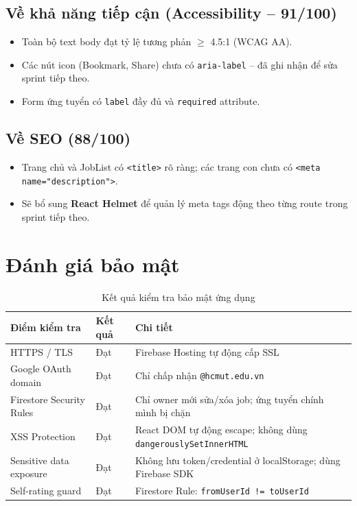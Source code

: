 \subsection{Về khả năng tiếp cận (Accessibility -- 91/100)}

\begin{itemize}
  \item Toàn bộ text body đạt tỷ lệ tương phản $\geq$ 4.5:1 (WCAG AA).
  \item Các nút icon (Bookmark, Share) chưa có \texttt{aria-label} -- đã ghi nhận để
    sửa sprint tiếp theo.
  \item Form ứng tuyển có \texttt{label} đầy đủ và \texttt{required} attribute.
\end{itemize}

\subsection{Về SEO (88/100)}

\begin{itemize}
  \item Trang chủ và JobList có \texttt{<title>} rõ ràng; các trang con chưa có
    \texttt{<meta name="description">}.
  \item Sẽ bổ sung \textbf{React Helmet} để quản lý meta tags động theo từng route
    trong sprint tiếp theo.
\end{itemize}

\section{Đánh giá bảo mật}

\begin{table}[H]
\centering
\caption{Kết quả kiểm tra bảo mật ứng dụng}
\renewcommand{\arraystretch}{1.2}
\begin{tabularx}{\textwidth}{|p{4.5cm}|p{2.5cm}|X|}
\hline
\textbf{Điểm kiểm tra} & \textbf{Kết quả} & \textbf{Chi tiết} \\
\hline
HTTPS / TLS            & Đạt & Firebase Hosting tự động cấp SSL \\
\hline
Google OAuth domain    & Đạt & Chỉ chấp nhận \texttt{@hcmut.edu.vn} \\
\hline
Firestore Security Rules & Đạt & Chỉ owner mới sửa/xóa job; ứng tuyển chính mình bị chặn \\
\hline
XSS Protection         & Đạt & React DOM tự động escape; không dùng \texttt{dangerouslySetInnerHTML} \\
\hline
Sensitive data exposure & Đạt & Không lưu token/credential ở localStorage; dùng Firebase SDK \\
\hline
Self-rating guard      & Đạt & Firestore Rule: \texttt{fromUserId != toUserId} \\
\hline
\end{tabularx}
\end{table}

